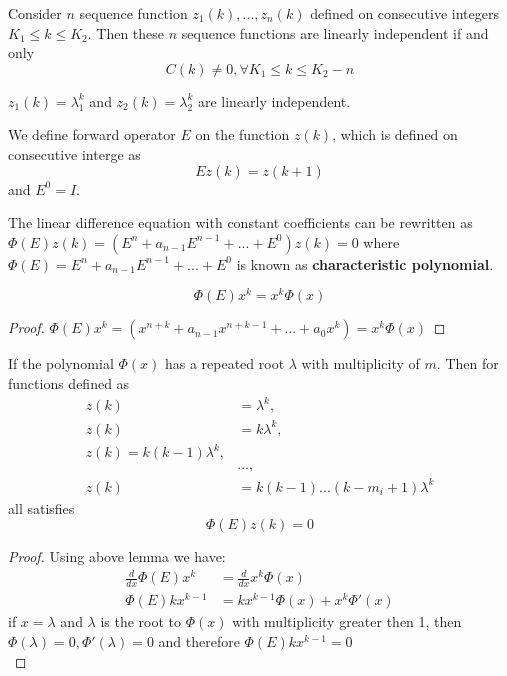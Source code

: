 \begin{refsection}
\begin{lemma}\cite[149]{jerri2013linear}
Consider $n$ sequence function $z_1(k),...,z_n(k)$ defined on consecutive integers $K_1\leq k \leq K_2$. Then these $n$ sequence functions are linearly independent if and only 
$$C(k) \neq 0,\forall K_1\leq k\leq K_2-n$$
\end{lemma}





\begin{lemma}
$z_1(k) = \lambda_1^k$ and $z_2(k) = \lambda_2^k$ are linearly independent.
\end{lemma}




\begin{definition}
We define forward operator $E$ on the function $z(k)$, which is defined on consecutive interge as
$$Ez(k) = z(k+1)$$
and $E^0 = I$.
\end{definition}


\begin{definition}
The linear difference equation with constant coefficients can be rewritten as
$\Phi(E)z(k) = (E^n + a_{n-1}E^{n-1} + ... + E^0)z(k) = 0$
where $\Phi(E) = E^n + a_{n-1}E^{n-1} + ... + E^0$ is known as \textbf{characteristic polynomial}.
\end{definition}


\begin{lemma}
$$\Phi(E)x^k  = x^k\Phi(x)$$
\end{lemma}
\begin{proof}
$\Phi(E)x^k = (x^{n+k} + a_{n-1}x^{n+k-1} + ... + a_0x^k) = x^k\Phi(x)$
\end{proof}



\begin{theorem}
If the polynomial $\Phi(x)$ has a repeated root $\lambda$ with multiplicity of $m$. Then for functions defined as 
\begin{align*}
z(k) &= \lambda^k,\\
z(k) &= k\lambda^{k},\\ z(k)=k(k-1)\lambda^k,\\
&...,\\
z(k) &= k(k-1)...(k-m_i+1)\lambda^k
\end{align*}
all satisfies
$$\Phi(E) z(k) = 0$$
\end{theorem}
\begin{proof}
Using above lemma we have:
\begin{align*}
    \frac{d}{dx}\Phi(E)x^k &= \frac{d}{dx}x^k\Phi(x)\\
    \Phi(E)kx^{k-1} &= kx^{k-1}\Phi(x) + x^k\Phi'(x)
\end{align*}
if $x=\lambda$ and $\lambda$ is the root to $\Phi(x)$ with multiplicity greater then 1, then $\Phi(\lambda)=0,\Phi'(\lambda) = 0$ and therefore $\Phi(E)kx^{k-1} = 0$ \\


\end{proof}
\end{refsection}
